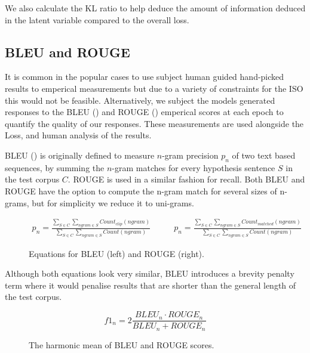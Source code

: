 \documentclass[12pt,twoside]{report}
\begin{document}
We also calculate the KL ratio to help deduce the amount of information deduced in the latent variable compared to the overall loss.

\subsection{BLEU and ROUGE}

It is common in the popular cases to use subject human guided hand-picked results to emperical measurements but due to a variety of constraints for the ISO this would not be feasible. Alternatively, we subject the models generated responses to the BLEU (\cite{papineni_bleu:_2001}) and ROUGE (\cite{lin_rouge:_2004}) emperical scores at each epoch to quantify the quality of our responses. These measurements are used alongside the Loss, and human analysis of the results.


BLEU (\cite{papineni_bleu:_2001}) is originally defined to measure $n$-gram precision $p_n$ of two text based sequences, by summing the $n$-gram matches for every hypothesis sentence $S$ in the test corpus $C$. ROUGE is used in a similar fashion for recall. Both BLEU and ROUGE have the option to compute the n-gram match for several sizes of n-grams, but for simplicity we reduce it to uni-grams.

\begin{figure}[!ht]
	\begin{equation}
		\begin{split}
			p_n = \frac
			{\sum_{S\in C} \sum_{ngram\in S} Count_{clip}(ngram)}
			{\sum_{S\in C} \sum_{ngram\in S} Count(ngram)}
		\end{split}
		\quad\quad
		\begin{split}
			p_n = \frac
			{\sum_{S\in C} \sum_{ngram\in S} Count_{matched}(ngram)}
			{\sum_{S\in C} \sum_{ngram\in S} Count(ngram)}
		\end{split}
	\end{equation}
	\caption{Equations for BLEU (left) and ROUGE (right).}
	\end{figure}

Although both equations look very similar, BLEU introduces a brevity penalty term where it would penalise results that are shorter than the general length of the test corpus.

\begin{figure}[!ht]
	\begin{equation}
		f1_{n} = 2 \frac{BLEU_n \cdot ROUGE_n}{BLEU_n + ROUGE_n}
	\end{equation}
	\caption{The harmonic mean of BLEU and ROUGE scores.}
\end{figure}
\end{document}
